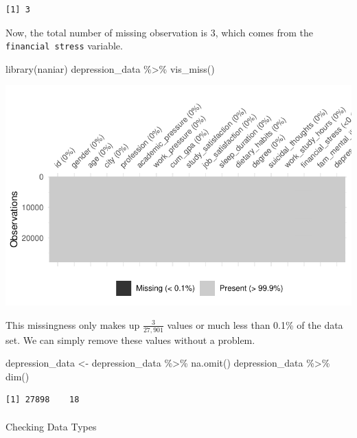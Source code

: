\documentclass[
  letterpaper,
  DIV=11,
  numbers=noendperiod]{scrartcl}
\makeatletter
\let\oldparagraph\paragraph
\renewcommand{\paragraph}{
    \@ifstar
      \xxxParagraphStar
      \xxxParagraphNoStar
  }
\newcommand{\xxxParagraphStar}[1]{\oldparagraph*{#1}\mbox{}}
\newcommand{\xxxParagraphNoStar}[1]{\oldparagraph{#1}\mbox{}}
\newenvironment{Shaded}{\begin{snugshade}}{\end{snugshade}}
\newcommand{\FunctionTok}[1]{\textcolor[rgb]{0.28,0.35,0.67}{#1}}
\newcommand{\NormalTok}[1]{\textcolor[rgb]{0.00,0.23,0.31}{#1}}
\newcommand{\OtherTok}[1]{\textcolor[rgb]{0.00,0.23,0.31}{#1}}
\newcommand{\SpecialCharTok}[1]{\textcolor[rgb]{0.37,0.37,0.37}{#1}}
\makeatother
\begin{document}
\begin{verbatim}
[1] 3
\end{verbatim}

Now, the total number of missing observation is 3, which comes from the
\texttt{financial\ stress} variable.

\begin{Shaded}
\begin{Highlighting}[numbers=left,,]
\FunctionTok{library}\NormalTok{(naniar)}
\NormalTok{depression\_data }\SpecialCharTok{\%\textgreater{}\%} \FunctionTok{vis\_miss}\NormalTok{()}
\end{Highlighting}
\end{Shaded}

\includegraphics{Final_Project-Step-2_files/figure-pdf/unnamed-chunk-5-1.pdf}

This missingness only makes up \(\frac{3}{27,901}\) values or much less
than 0.1\% of the data set. We can simply remove these values without a
problem.

\begin{Shaded}
\begin{Highlighting}[numbers=left,,]
\NormalTok{depression\_data }\OtherTok{\textless{}{-}}\NormalTok{ depression\_data }\SpecialCharTok{\%\textgreater{}\%} \FunctionTok{na.omit}\NormalTok{()}
\NormalTok{depression\_data }\SpecialCharTok{\%\textgreater{}\%} \FunctionTok{dim}\NormalTok{()}
\end{Highlighting}
\end{Shaded}

\begin{verbatim}
[1] 27898    18
\end{verbatim}

\paragraph{Checking Data Types}\label{checking-data-types}
\end{document}
